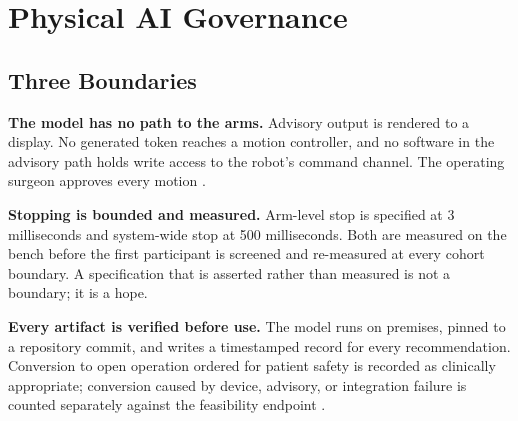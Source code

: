 \section{Physical AI Governance}

\subsection{Three Boundaries}

\textbf{The model has no path to the arms.} Advisory output is rendered to a
display. No generated token reaches a motion controller, and no software in the
advisory path holds write access to the robot's command channel. The operating
surgeon approves every motion \cite{onpremwhippl}.

\textbf{Stopping is bounded and measured.} Arm-level stop is specified at 3
milliseconds and system-wide stop at 500 milliseconds. Both are measured on the
bench before the first participant is screened and re-measured at every cohort
boundary. A specification that is asserted rather than measured is not a
boundary; it is a hope.

\textbf{Every artifact is verified before use.} The model runs on premises,
pinned to a repository commit, and writes a timestamped record for every
recommendation. Conversion to open operation ordered for patient safety is
recorded as clinically appropriate; conversion caused by device, advisory, or
integration failure is counted separately against the feasibility endpoint
\cite{phase1ind}.

